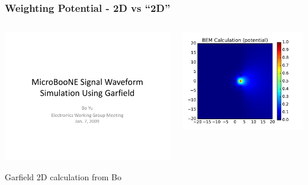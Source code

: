 \documentclass[xcolor=dvipsnames]{beamer}
\begin{document}
\begin{frame}
  \frametitle{Weighting Potential - 2D vs ``2D''}

  \vspace{-5mm}

  \begin{columns}
    \begin{column}{0.5\textwidth}
      \begin{center}
        \includegraphics[height=0.65\textheight,page=5,angle=-90,clip,trim=0 0 0 5mm]{GarfieldSimulation-BoYu.pdf}

        \scriptsize Garfield 2D calculation from Bo
      \end{center}
    \end{column}
    \begin{column}{0.5\textwidth}
      \begin{center}
        \includegraphics[height=0.65\textheight]{parallel-near-d11.pdf}


\end{center}
\end{column}
\end{columns}
\end{frame}
\end{document}
